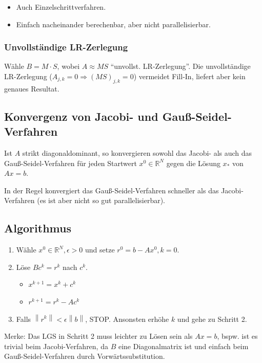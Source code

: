 \documentclass[a4paper, 14pt]{article}
\newcommand{\norm}[1]{\left\lVert#1\right\rVert}
\begin{document}
	\begin{itemize}
		\item Auch Einzelschrittverfahren.
		\item Einfach nacheinander berechenbar, aber nicht parallelisierbar.
	\end{itemize}

	\subsubsection{Unvollständige LR-Zerlegung}

	Wähle $B = M \cdot S$, wobei $A \approx M S$ \enquote{unvollst. LR-Zerlegung}.
	Die unvollständige LR-Zerlegung ($A_{j,k} = 0 \Rightarrow (MS)_{j,k} = 0$) vermeidet Fill-In, liefert aber kein genaues Resultat.

	\subsection{Konvergenz von Jacobi- und Gauß-Seidel-Verfahren}

	Ist $A$ strikt diagonaldominant, so konvergieren sowohl das Jacobi- als auch das Gauß-Seidel-Verfahren für jeden Startwert $x^0 \in \mathbb{R}^N$ gegen die Lösung $x_*$ von $Ax = b$.

	In der Regel konvergiert das Gauß-Seidel-Verfahren schneller als das Jacobi-Verfahren (es ist aber nicht so gut parallelisierbar).

	\subsection{Algorithmus}

	\begin{enumerate}
		\item Wähle $x^0 \in \mathbb{R}^N, \epsilon > 0$ und setze $r^0 = b - A x^0, k = 0$.
		\item Löse $B c^k = r^k$ nach $c^k$.
		\begin{itemize}
			\item $x^{k + 1} = x^k + c^k$
			\item $r^{k + 1} = r^k - A c^k$
		\end{itemize}
		\item Falls $\norm{r^k} < \epsilon \norm{b}$, STOP. Ansonsten erhöhe $k$ und gehe zu Schritt 2.
	\end{enumerate}

	Merke: Das LGS in Schritt 2 muss leichter zu Lösen sein als $Ax = b$, bspw. ist es trivial beim Jacobi-Verfahren, da $B$ eine Diagonalmatrix ist und einfach beim Gauß-Seidel-Verfahren durch Vorwärtssubstitution.
\end{document}
